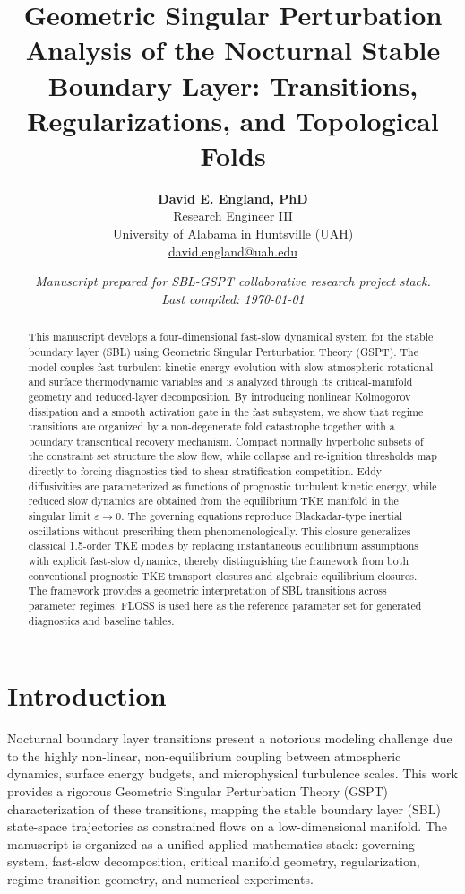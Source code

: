 \documentclass[11pt,letterpaper]{article}
\title{\textbf{Geometric Singular Perturbation Analysis of the Nocturnal Stable Boundary Layer: Transitions, Regularizations, and Topological Folds}}
\author{
    \textbf{David E. England, PhD} \\
    \small Research Engineer III \\
    \small University of Alabama in Huntsville (UAH) \\
    \small \href{mailto:david.england@uah.edu}{david.england@uah.edu}
}
\date{\small\itshape Manuscript prepared for SBL-GSPT collaborative research project stack. \\ Last compiled: \today}
\begin{document}
\maketitle

\begin{abstract}
This manuscript develops a four-dimensional fast-slow dynamical system for the stable boundary layer (SBL) using Geometric Singular Perturbation Theory (GSPT). The model couples fast turbulent kinetic energy evolution with slow atmospheric rotational and surface thermodynamic variables and is analyzed through its critical-manifold geometry and reduced-layer decomposition. By introducing nonlinear Kolmogorov dissipation and a smooth activation gate in the fast subsystem, we show that regime transitions are organized by a non-degenerate fold catastrophe together with a boundary transcritical recovery mechanism. Compact normally hyperbolic subsets of the constraint set structure the slow flow, while collapse and re-ignition thresholds map directly to forcing diagnostics tied to shear-stratification competition. Eddy diffusivities are parameterized as functions of prognostic turbulent kinetic energy, while reduced slow dynamics are obtained from the equilibrium TKE manifold in the singular limit $\varepsilon\to 0$. The governing equations reproduce Blackadar-type inertial oscillations without prescribing them phenomenologically. This closure generalizes classical 1.5-order TKE models by replacing instantaneous equilibrium assumptions with explicit fast-slow dynamics, thereby distinguishing the framework from both conventional prognostic TKE transport closures and algebraic equilibrium closures. The framework provides a geometric interpretation of SBL transitions across parameter regimes; FLOSS is used here as the reference parameter set for generated diagnostics and baseline tables.
\end{abstract}


\section{Introduction}
\label{sec:introduction}
Nocturnal boundary layer transitions present a notorious modeling challenge due to the highly non-linear, non-equilibrium coupling between atmospheric dynamics, surface energy budgets, and microphysical turbulence scales. This work provides a rigorous Geometric Singular Perturbation Theory (GSPT) characterization of these transitions, mapping the stable boundary layer (SBL) state-space trajectories as constrained flows on a low-dimensional manifold.
The manuscript is organized as a unified applied-mathematics stack: governing system, fast-slow decomposition, critical manifold geometry, regularization, regime-transition geometry, and numerical experiments.
\end{document}
